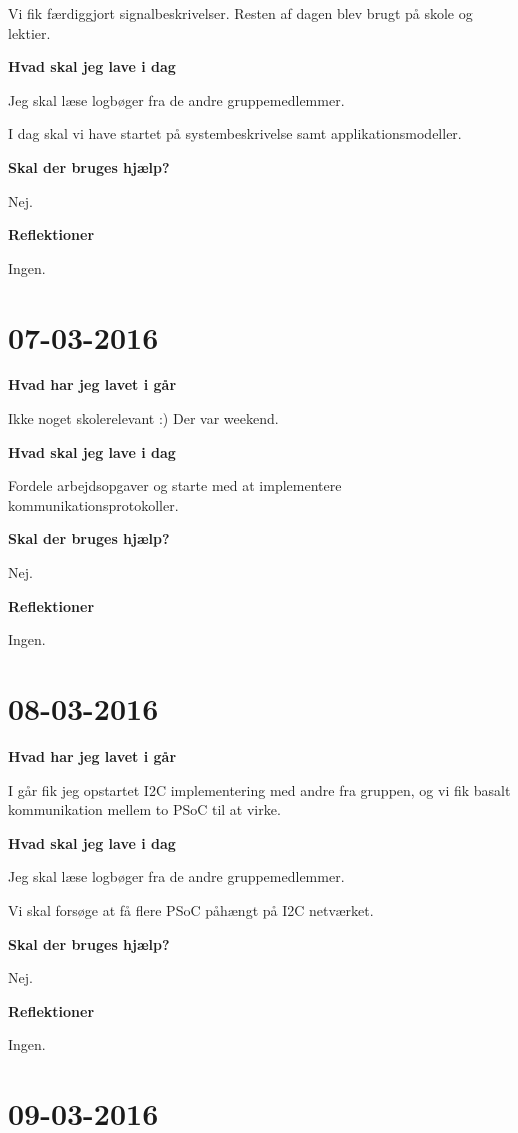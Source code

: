 \documentclass{article}
\begin{document}
	Vi fik færdiggjort signalbeskrivelser. Resten af dagen blev brugt på skole og lektier.
	
	\textbf{Hvad skal jeg lave i dag}
	
	Jeg skal læse logbøger fra de andre gruppemedlemmer.
	
	I dag skal vi have startet på systembeskrivelse samt applikationsmodeller.
	
	\textbf{Skal der bruges hjælp?}
	
	Nej.
	
	\textbf{Reflektioner}
	
	Ingen.
	
	\section{07-03-2016}
	
	\textbf{Hvad har jeg lavet i går}
	
	Ikke noget skolerelevant :) Der var weekend.
	
	\textbf{Hvad skal jeg lave i dag}
	
	Fordele arbejdsopgaver og starte med at implementere kommunikationsprotokoller.
	
	\textbf{Skal der bruges hjælp?}
	
	Nej.
	
	\textbf{Reflektioner}
	
	Ingen.
	
	\section{08-03-2016}
	
	\textbf{Hvad har jeg lavet i går}
	
	I går fik jeg opstartet I2C implementering med andre fra gruppen, og vi fik basalt kommunikation mellem to PSoC til at virke.
	
	\textbf{Hvad skal jeg lave i dag}
	
	Jeg skal læse logbøger fra de andre gruppemedlemmer.
	
	Vi skal forsøge at få flere PSoC påhængt på I2C netværket.
	
	\textbf{Skal der bruges hjælp?}
	
	Nej.
	
	\textbf{Reflektioner}
	
	Ingen.
	
	\section{09-03-2016}
	
\end{document}
